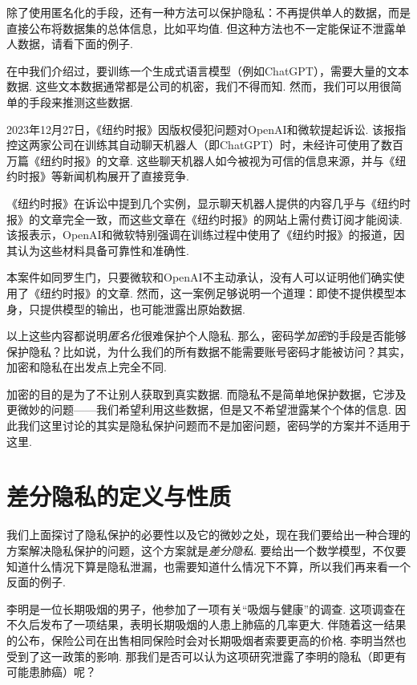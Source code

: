 除了使用匿名化的手段，还有一种方法可以保护隐私：不再提供单人的数据，而是直接公布将数据集的总体信息，比如平均值. 但这种方法也不一定能保证不泄露单人数据，请看下面的例子. 

在中我们介绍过，要训练一个生成式语言模型（例如ChatGPT），需要大量的文本数据. 这些文本数据通常都是公司的机密，我们不得而知. 然而，我们可以用很简单的手段来推测这些数据. 

2023年12月27日，《纽约时报》因版权侵犯问题对OpenAI和微软提起诉讼. 该报指控这两家公司在训练其自动聊天机器人（即ChatGPT）时，未经许可使用了数百万篇《纽约时报》的文章. 这些聊天机器人如今被视为可信的信息来源，并与《纽约时报》等新闻机构展开了直接竞争. 

《纽约时报》在诉讼中提到几个实例，显示聊天机器人提供的内容几乎与《纽约时报》的文章完全一致，而这些文章在《纽约时报》的网站上需付费订阅才能阅读. 该报表示，OpenAI和微软特别强调在训练过程中使用了《纽约时报》的报道，因其认为这些材料具备可靠性和准确性. 

本案件如同罗生门，只要微软和OpenAI不主动承认，没有人可以证明他们确实使用了《纽约时报》的文章. 然而，这一案例足够说明一个道理：即使不提供模型本身，只提供模型的输出，也可能泄露出原始数据.

\begin{remark}
以上这些内容都说明\textit{匿名化}很难保护个人隐私. 那么，密码学\textit{加密}的手段是否能够保护隐私？比如说，为什么我们的所有数据不能需要账号密码才能被访问？其实，加密和隐私在出发点上完全不同. 

加密的目的是为了不让别人获取到真实数据. 而隐私不是简单地保护数据，它涉及更微妙的问题——我们希望利用这些数据，但是又不希望泄露某个个体的信息. 因此我们这里讨论的其实是隐私保护问题而不是加密问题，密码学的方案并不适用于这里.
\end{remark}

\section{差分隐私的定义与性质}

我们上面探讨了隐私保护的必要性以及它的微妙之处，现在我们要给出一种合理的方案解决隐私保护的问题，这个方案就是\textit{差分隐私}. 要给出一个数学模型，不仅要知道什么情况下算是隐私泄漏，也需要知道什么情况下不算，所以我们再来看一个反面的例子. 

李明是一位长期吸烟的男子，他参加了一项有关“吸烟与健康”的调查. 这项调查在不久后发布了一项结果，表明长期吸烟的人患上肺癌的几率更大. 伴随着这一结果的公布，保险公司在出售相同保险时会对长期吸烟者索要更高的价格. 李明当然也受到了这一政策的影响. 那我们是否可以认为这项研究泄露了李明的隐私（即更有可能患肺癌）呢？

